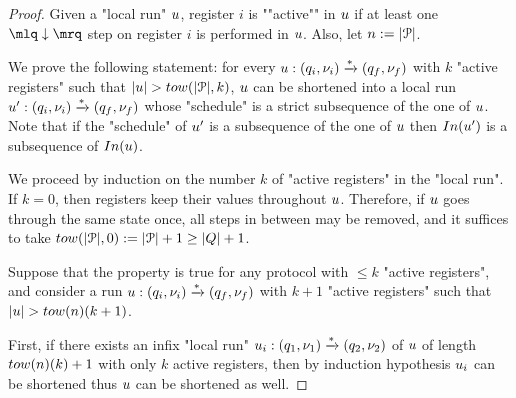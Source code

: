 \ifproofs
\begin{proof}

Given a "local run" $u$, register $i$ is ""active"" in $u$ if at least one $\quotemarks{\enregact}$ step on register $i$ is performed in $u$. Also, let $n:=|\mathcal{P}|$.

We prove the following statement:
for every $u: (q_i, \nu_i) \xrightarrow{*} (q_f, \nu_f)$ with $k$ "active registers" such that $\length{\localrun} > \towerfun(|\prot|,k)$, $u$ can be shortened into a local run $u': (q_i, \nu_i) \xrightarrow{*} (q_f, \nu_f)$ whose "schedule" is a strict subsequence of the one of $u$. Note that if the "schedule" of $u'$ is a subsequence of the one of $u$ then $\Input{\localrun'}$ is a subsequence of $\Input{\localrun}$.

We proceed by induction on the number $k$ of "active registers" in the "local run". If $k=0$, then registers keep their values throughout $u$. Therefore, if $u$ goes through the same state once, all steps in between may be removed, and it suffices to take $\towerfun(\size{\prot}, 0) := |\prot| + 1 \geq |Q| +1$.  

Suppose that the property is true for any protocol with $\leq k$ "active registers", and consider a run $u: (q_i,\nu_i) \xrightarrow{*} (q_f,\nu_f)$ with $k+1$ "active registers" such that $\length{\localrun} > \towerfun(n)(k+1)$.

First, if there exists an infix "local run" $u_i: (q_1, \nu_1) \xrightarrow{*} (q_2, \nu_2)$ of $u$ of length $\towerfun(n)(k)+1$ with only $k$ active registers, then by induction hypothesis $u_i$ can be shortened thus $u$ can be shortened as well.


\end{proof}

